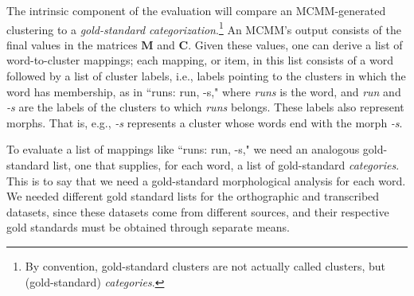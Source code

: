 The intrinsic component of the evaluation will compare an MCMM-generated clustering to a 
\emph{gold-standard categorization}.\footnote{By convention, 
gold-standard clusters are not actually called clusters, 
but (gold-standard) \emph{categories}.} 
An MCMM's output consists of 
the final values in the matrices $\mathbf{M}$ and $\mathbf{C}$.
Given these values, one can derive a list of word-to-cluster mappings; 
each mapping, or item, in this list
consists of a word followed by a list of cluster labels, i.e., labels pointing to
the clusters in which the word has membership, 
as in ``runs: run, -s,"  where \textit{runs} is the word, and \textit{run} and \textit{-s} 
are the labels of the clusters to which \textit{runs} belongs. These labels also represent 
morphs. That is, e.g., \emph{-s} represents a cluster whose words end with the morph 
\emph{-s}.

To evaluate a list of mappings like ``runs: run, -s," we need an analogous 
gold-standard list, one that supplies, for each word, a list of gold-standard \emph{categories}.
This is to say that we need a gold-standard morphological analysis for each word. 
We needed different gold standard lists for the orthographic and transcribed datasets, 
since these datasets come from different sources, and their respective gold standards must 
be obtained through separate means.


 
